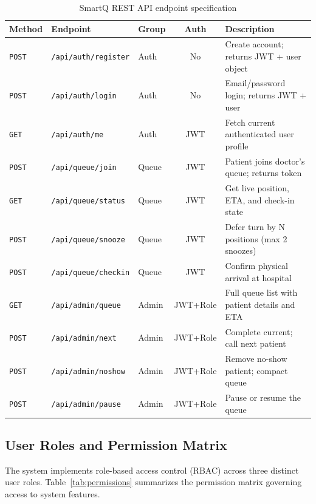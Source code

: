 \documentclass[12pt,a4paper]{article}
\begin{document}
\begin{table}[H]
\centering
\caption{SmartQ REST API endpoint specification}
\label{tab:api-endpoints}
\small
\begin{tabularx}{\textwidth}{l l l c X}
\toprule
\textbf{Method} & \textbf{Endpoint} & \textbf{Group} & \textbf{Auth} & \textbf{Description} \\
\midrule
\texttt{POST} & \texttt{/api/auth/register} & Auth & No & Create account; returns JWT + user object \\
\texttt{POST} & \texttt{/api/auth/login} & Auth & No & Email/password login; returns JWT + user \\
\texttt{GET} & \texttt{/api/auth/me} & Auth & JWT & Fetch current authenticated user profile \\
\midrule
\texttt{POST} & \texttt{/api/queue/join} & Queue & JWT & Patient joins doctor's queue; returns token \\
\texttt{GET} & \texttt{/api/queue/status} & Queue & JWT & Get live position, ETA, and check-in state \\
\texttt{POST} & \texttt{/api/queue/snooze} & Queue & JWT & Defer turn by N positions (max 2 snoozes) \\
\texttt{POST} & \texttt{/api/queue/checkin} & Queue & JWT & Confirm physical arrival at hospital \\
\midrule
\texttt{GET} & \texttt{/api/admin/queue} & Admin & JWT+Role & Full queue list with patient details and ETA \\
\texttt{POST} & \texttt{/api/admin/next} & Admin & JWT+Role & Complete current; call next patient \\
\texttt{POST} & \texttt{/api/admin/noshow} & Admin & JWT+Role & Remove no-show patient; compact queue \\
\texttt{POST} & \texttt{/api/admin/pause} & Admin & JWT+Role & Pause or resume the queue \\
\bottomrule
\end{tabularx}
\end{table}

\subsection{User Roles and Permission Matrix}

The system implements role-based access control (RBAC) across three distinct user roles. Table~\ref{tab:permissions} summarizes the permission matrix governing access to system features.
\end{document}
